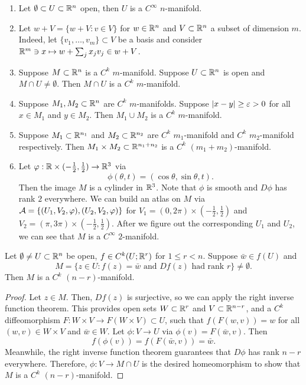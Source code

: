 \documentclass[a4paper]{article}
\begin{document}
\begin{eg}
\begin{enumerate}
\item Let $\emptyset \subset U \subset \mathbb{R}^n$ open, then 
$U$ is a $C^\infty$ $n$-manifold. 

\item Let $w + V = \{w + V : v \in V\}$ for $w \in \mathbb{R}^n$
and $V \subset \mathbb{R}^n$ a subset of dimension $m$. Indeed, 
let $\{v_1, \dots, v_m\} \subset V$ be a basis and consider 
$\mathbb{R}^m \ni x \mapsto w + \sum_j x_j v_j \in w + V$.

\item Suppose $M \subset \mathbb{R}^n$ is a $C^k$ $m$-manifold. 
Suppose $U \subset \mathbb{R}^n$ is open and $M \cap U \neq 
\emptyset$. Then $M \cap U$ is a $C^k$ $m$-manifold.

\item Suppose $M_1, M_2 \subset \mathbb{R}^n$ are $C^k$
$m$-manifolds. Suppose $\left\lvert x - y\right\rvert \geq \varepsilon > 0$ for all 
$x \in M_1$ and $y \in M_2$. Then $M_1 \cup M_2$ is a 
$C^k$ $m$-manifold.

\item Suppose $M_1 \subset \mathbb{R}^{n_1}$ and $M_2 \subset \mathbb{R}^{n_2}$
are $C^k$ $m_1$-manifold and $C^k$ $m_2$-manifold respectively. 
Then $M_1 \times M_2 \subset \mathbb{R}^{n_1 + n_2}$ is a 
$C^k$ $(m_1 + m_2)$-manifold.

\item Let $\varphi: \mathbb{R} \times (-\frac{1}{2}, \frac{1}{2}) 
\to \mathbb{R}^3$ via 
\[
\phi(\theta, t) = (\cos \theta, \sin \theta, t).
\]
Then the image $M$ is a cylinder in $\mathbb{R}^3$. Note that $\phi$
is smooth and $D \phi$ has rank $2$ everywhere. We can build 
an atlas on $M$ via $\mathcal{A} = \{(U_1, V_2, \varphi), (U_2, V_2, \varphi)\}$ 
for $V_1 = (0, 2\pi) \times (-\frac{1}{2}, \frac{1}{2})$ and
$V_2 = (\pi, 3\pi) \times (-\frac{1}{2}, \frac{1}{2})$.
After we figure out the corresponding $U_1$ and $U_2$, 
we can see that $M$ is a $C^\infty$ $2$-manifold.
\end{enumerate}
\end{eg}

\begin{thm}
Let $\emptyset \neq U \subset \mathbb{R}^n$ be open, $f \in C^k(U; 
\mathbb{R}^r)$ for $1 \leq r < n$. Suppose $\bar{w} \in f(U)$ and 
\[
M = \{z \in U : f(z) = \bar{w} \text{ and } Df(z) \text{ had rank 
$r$}\} \neq \emptyset.
\]
Then $M$ is a $C^k$ $(n-r)$-manifold.
\end{thm}

\begin{proof}
Let $z \in M$. Then, $Df(z)$ is surjective, so we can apply
the right inverse function theorem.  This provides 
open sets $W \subset \mathbb{R}^r$ and $V \subset \mathbb{R}^{n-r}$, and 
a $C^k$ diffeomorphism 
$F : W \times V \to F(W \times V) \subset U$, such that 
$f(F(w, v)) = w$ for all $(w, v) \in W \times V$ and 
$\bar{w} \in W$. Let $\phi: V \to U$ via 
$\phi(v) = F(\bar{w}, v)$. Then
\[
f(\phi(v)) = f(F(\bar{w}, v)) = \bar{w}.
\]
Meanwhile, the right inverse function theorem 
guarantees that $D \phi$ has rank $n - r$ everywhere.
Therefore, $\phi: V \to M \cap U$ is the desired 
homeomorphism to show that $M$ is a $C^k$ $(n-r)$-manifold.
\end{proof}
\end{document}
